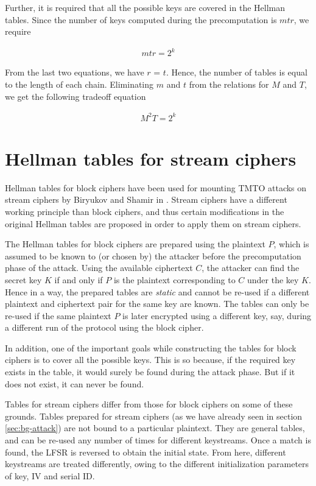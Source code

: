Further, it is required that all the possible keys are covered in the Hellman tables. Since the number of keys computed during the precomputation is $mtr$, we require

\begin{align*}
mtr = 2^k
\end{align*}

From the last two equations, we have $r$ = $t$. Hence, the number of tables is equal to the length of each chain. Eliminating $m$ and $t$ from the relations for $M$ and $T$, we get the following tradeoff equation

\begin{align*}
M^{2}T = 2^k
\end{align*}


\section{Hellman tables for stream ciphers}

Hellman tables for block ciphers have been used for mounting TMTO attacks on stream ciphers by Biryukov and Shamir in \cite{biryukov2000ctm}. Stream ciphers have a different working principle than block ciphers, and thus certain modifications in the original Hellman tables are proposed in order to apply them on stream ciphers. 

The Hellman tables for block ciphers are prepared using the plaintext $P$, which is assumed to be known to (or chosen by) the attacker before the precomputation phase of the attack. Using the available ciphertext $C$, the attacker can find the secret key $K$ if and only if $P$ is the plaintext corresponding to $C$ under the key $K$. Hence in a way, the prepared tables are \emph{static} and cannot be re-used if a different plaintext and ciphertext pair for the same key are known. The tables can only be re-used if the same plaintext $P$ is later encrypted using a different key, say, during a different run of the protocol using the block cipher.

In addition, one of the important goals while constructing the tables for block ciphers is to cover all the possible keys. This is so because, if the required key exists in the table, it would surely be found during the attack phase. But if it does not exist, it can never be found. 

Tables for stream ciphers differ from those for block ciphers on some of these grounds. Tables prepared for stream ciphers (as we have already seen in section \ref{sec:bg-attack}) are not bound to a particular plaintext. They are general tables, and can be re-used any number of times for different keystreams. Once a match is found, the LFSR is reversed to obtain the initial state. From here, different keystreams are treated differently, owing to the different initialization parameters of key, IV and serial ID.

